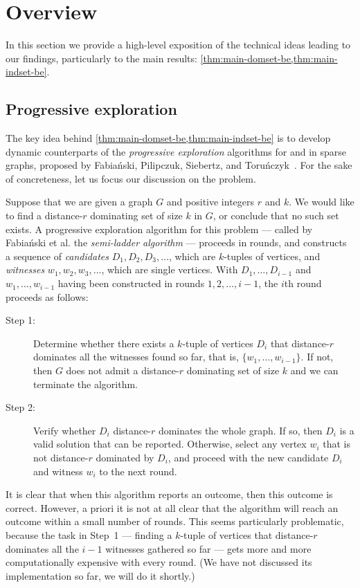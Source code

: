 \section{Overview}\label{sec:overview}

In this section we provide a high-level exposition of the technical ideas leading to our findings, particularly to the main results: \cref{thm:main-domset-be,thm:main-indset-be}.

\subsection{Progressive exploration}

The key idea behind \cref{thm:main-domset-be,thm:main-indset-be} is to develop dynamic counterparts of the \emph{progressive exploration} algorithms for  and  in sparse graphs, proposed by Fabia\'nski, Pilipczuk, Siebertz, and Toru\'nczyk~\cite{FabianskiPST19}. For the sake of concreteness, let us focus our discussion on the  problem.

Suppose that we are given a graph $G$ and positive integers $r$ and $k$. We would like to find a distance-$r$ dominating set of size $k$ in $G$, or conclude that no such set exists. A progressive exploration algorithm for this problem --- called by Fabia\'nski et al. the \emph{semi-ladder algorithm} --- proceeds in rounds, and constructs a sequence of \emph{candidates} $D_1,D_2,D_3,\ldots$, which are $k$-tuples of vertices, and \emph{witnesses} $w_1,w_2,w_3,\ldots$, which are single vertices. With $D_1,\ldots,D_{i-1}$ and $w_1,\ldots,w_{i-1}$ having been constructed in rounds $1,2,\ldots,i-1$, the $i$th round proceeds as follows:
\begin{description}
	\item[Step 1:] Determine whether there exists a $k$-tuple of vertices $D_i$ that distance-$r$ dominates all the witnesses found so far, that is, $\{w_1,\ldots,w_{i-1}\}$. If not, then $G$ does not admit a distance-$r$ dominating set of size $k$ and we can terminate the algorithm.
	\item[Step 2:] Verify whether $D_i$ distance-$r$ dominates the whole graph. If so, then $D_i$ is a valid solution that can be reported. Otherwise, select any vertex $w_i$ that is not distance-$r$ dominated by $D_i$, and proceed with the new candidate $D_i$ and witness $w_i$ to the next round.
\end{description}
It is clear that when this algorithm reports an outcome, then this outcome is correct. However, a priori it is not at all clear that the algorithm will reach an outcome within a small number of rounds. This seems particularly problematic, because the task  in Step~1 --- finding a $k$-tuple of vertices that distance-$r$ dominates all the $i-1$ witnesses gathered so far --- gets more and more computationally expensive with every round. (We have not discussed its implementation so far, we will do it shortly.)

